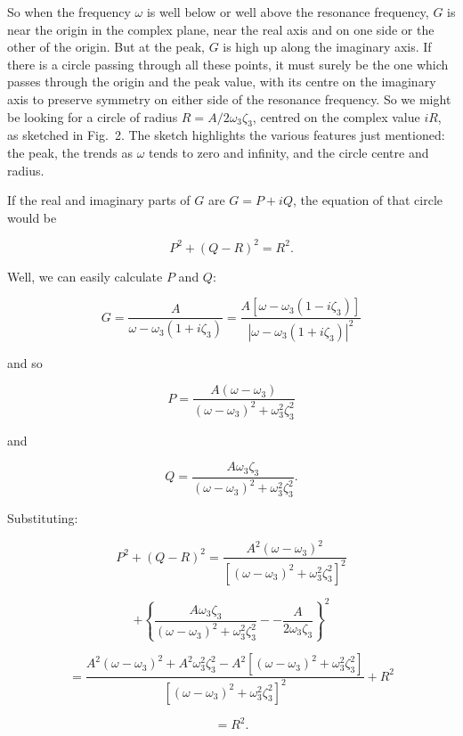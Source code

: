   So when the frequency $\omega$ is well below or well above the resonance 
  frequency, $G$ is near the origin in the complex plane, near the real axis 
  and on one side or the other of the origin. But at the peak, $G$ is high up 
  along the imaginary axis. If there is a circle passing through all these 
  points, it must surely be the one which passes through the origin and the 
  peak value, with its centre on the imaginary axis to preserve symmetry on 
  either side of the resonance frequency. So we might be looking for a circle 
  of radius $R=A/2\omega_3 \zeta_3$, centred on the complex value $iR$, as 
  sketched in Fig.\ 2. The sketch highlights the various features just 
  mentioned: the peak, the trends as $\omega$ tends to zero and infinity, and 
  the circle centre and radius. 


  If the real and imaginary parts of $G$ are $G=P+iQ$, the equation of that 
  circle would be 

  $$P^2 + (Q-R)^2 = R^2. \tag{22}$$ 

  Well, we can easily calculate $P$ and $Q$: 

  
  $$G=\dfrac{A}{\omega-\omega_3(1+i\zeta_3)}=\dfrac{A[\omega-\omega_3(1-i\zeta_3)]}{|\omega-\omega_3(1+i\zeta_3)|^2} 
  \tag{23}$$ 

  and so 

  $$P=\dfrac{A(\omega-\omega_3)}{(\omega-\omega_3)^2 + \omega_3^2 \zeta_3^2} 
  \tag{24}$$ 

  and 

  $$Q=\dfrac{A\omega_3\zeta_3}{(\omega-\omega_3)^2 + \omega_3^2 \zeta_3^2} . 
  \tag{25}$$ 

  Substituting: 

  $$P^2 + (Q-R)^2 = \dfrac{A^2(\omega-\omega_3)^2}{[(\omega-\omega_3)^2 + 
  \omega_3^2 \zeta_3^2]^2}$$ 

  $$+ \left\lbrace \dfrac{A\omega_3\zeta_3}{(\omega-\omega_3)^2 + \omega_3^2 
  \zeta_3^2} -- \dfrac{A}{2 \omega_3 \zeta_3} \right\rbrace^2 $$ 

  $$=\dfrac{A^2(\omega-\omega_3)^2 + A^2 \omega_3^2 \zeta_3^2-A^2 
  [(\omega-\omega_3)^2 + \omega_3^2 \zeta_3^2]}{[(\omega-\omega_3)^2 + 
  \omega_3^2 \zeta_3^2]^2}+R^2$$ 

  $$=R^2. \tag{26}$$ 

